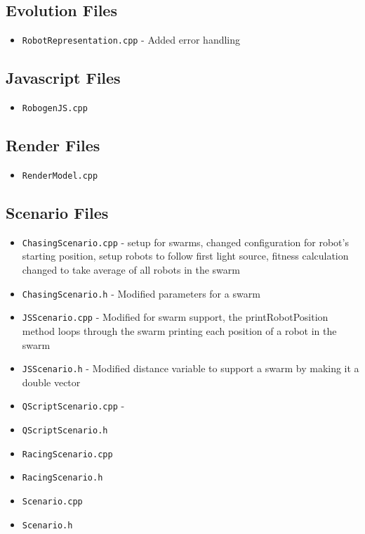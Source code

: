 \documentclass[11pt,a4paper]{article}
\begin{document}
\subsection{Evolution Files}
\begin{itemize}
    \item \texttt{RobotRepresentation.cpp} - Added error handling
\end{itemize}

\subsection{Javascript Files}
\begin{itemize}
    \item \texttt{RobogenJS.cpp}
\end{itemize}

\subsection{Render Files}
\begin{itemize}
    \item \texttt{RenderModel.cpp}
\end{itemize}

\subsection{Scenario Files}
\begin{itemize}
    \item \texttt{ChasingScenario.cpp} - setup for swarms, changed
        configuration for robot's starting position, setup robots to follow
        first light source, fitness calculation changed to take average of all
        robots in the swarm
    \item \texttt{ChasingScenario.h} - Modified parameters for a swarm
    \item \texttt{JSScenario.cpp} - Modified for swarm support, the
        printRobotPosition method loops through the swarm printing each position
        of a robot in the swarm
    \item \texttt{JSScenario.h} - Modified distance variable to support a swarm
        by making it a double vector
    \item \texttt{QScriptScenario.cpp} -
    \item \texttt{QScriptScenario.h}
    \item \texttt{RacingScenario.cpp}
    \item \texttt{RacingScenario.h}
    \item \texttt{Scenario.cpp}
    \item \texttt{Scenario.h}
\end{itemize}
\end{document}
